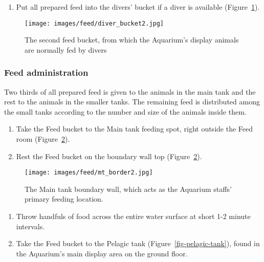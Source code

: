 \documentclass[
  letterpaper,
  DIV=11,
  numbers=noendperiod]{scrreprt}
\providecommand{\tightlist}{%
  \setlength{\itemsep}{0pt}\setlength{\parskip}{0pt}}\usepackage{longtable,booktabs,array}
\begin{document}
\begin{enumerate}
\def\labelenumi{\arabic{enumi}.}
\setcounter{enumi}{8}
\tightlist
\item
  Put all prepared feed into the divers' bucket if a diver is available
  (Figure~\ref{fig-diver-bucket}).
\end{enumerate}

\begin{figure}[H]

{\centering \texttt{[image: images/feed/diver\_bucket2.jpg]}

}

\caption{\label{fig-diver-bucket}The second feed bucket, from which the
Aquarium's display animals are normally fed by divers}

\end{figure}

\hypertarget{feed-administration}{%
\subsubsection{Feed administration}\label{feed-administration}}

Two thirds of all prepared feed is given to the animals in the main tank
and the rest to the animals in the smaller tanks. The remaining feed is
distributed among the small tanks according to the number and size of
the animals inside them.

\begin{enumerate}
\def\labelenumi{\arabic{enumi}.}
\setcounter{enumi}{9}
\tightlist
\item
  Take the Feed bucket to the Main tank feeding spot, right outside the
  Feed room (Figure~\ref{fig-mt-border}).
\item
  Rest the Feed bucket on the boundary wall top
  (Figure~\ref{fig-mt-border}).
\end{enumerate}

\begin{figure}[H]

{\centering \texttt{[image: images/feed/mt\_border2.jpg]}

}

\caption{\label{fig-mt-border}The Main tank boundary wall, which acts as
the Aquarium staffs' primary feeding location.}

\end{figure}

\begin{enumerate}
\def\labelenumi{\arabic{enumi}.}
\setcounter{enumi}{11}
\tightlist
\item
  Throw handfuls of food across the entire water surface at short 1-2
  minute intervals.
\item
  Take the Feed bucket to the Pelagic tank
  (Figure~\ref{fig-pelagic-tank}), found in the Aquarium's main display
  area on the ground floor.
\end{enumerate}
\end{document}
